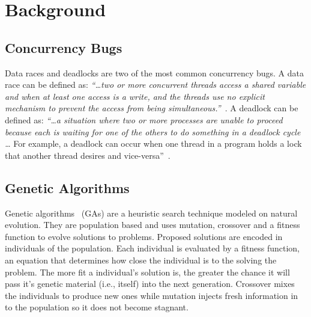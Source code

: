 \documentclass[runningheads,a4paper]{llncs}
\begin{document}
\section{Background}
\label{sec:background}

\subsection{Concurrency Bugs}
\label{sec:concurrency}

Data races and deadlocks are two of the most common concurrency bugs. A data race can be defined as: \textit{``\ldots two or more concurrent threads access a shared variable and when at least one access is a write, and the threads use no explicit mechanism to prevent the access from being simultaneous.''}~\cite{LSW07}. A deadlock can be defined as: \textit{``\ldots a situation where two or more processes are unable to proceed because each is waiting for one of the others to do something in a deadlock cycle \ldots} For example, a deadlock can occur when one thread in a program holds a lock that another thread desires and vice-versa''~\cite{LSW07}. 






\subsection{Genetic Algorithms}
\label{sec:genetic_algorithms}

Genetic algorithms~\cite{GA92} (GAs) are a heuristic search technique modeled on natural evolution.  They are population based and uses mutation, crossover and a fitness function to evolve solutions to problems. Proposed solutions are encoded in individuals of the population. Each individual is evaluated by a fitness function, an equation that determines how close the individual is to the solving the problem. The more fit a individual's solution is, the greater the chance it will pass it's genetic material (i.e., itself) into the next generation. Crossover mixes the individuals to produce new ones while mutation injects fresh information in to the population so it does not become stagnant.
\end{document}
